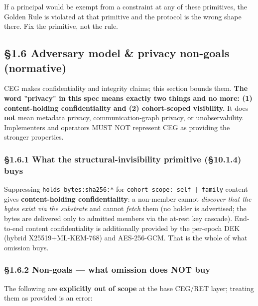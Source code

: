 \documentclass[10pt]{article}
\begin{document}
If a principal would be exempt from a constraint at any of these primitives, the Golden Rule is violated at that primitive and the protocol is the wrong shape there. Fix the primitive, not the rule.


\subsection*{§1.6 Adversary model \& privacy non-goals (normative)}


CEG makes confidentiality and integrity claims; this section bounds them. \textbf{The word "privacy" in this spec means exactly two things and no more: (1) content-holding confidentiality and (2) cohort-scoped visibility.} It does \textbf{not} mean metadata privacy, communication-graph privacy, or unobservability. Implementers and operators MUST NOT represent CEG as providing the stronger properties.


\subsubsection*{§1.6.1 What the structural-invisibility primitive (§10.1.4) buys}

Suppressing \texttt{holds\_bytes:sha256:*} for \texttt{cohort\_scope: self | family} content gives \textbf{content-holding confidentiality}: a non-member cannot \textit{discover that the bytes exist via the substrate} and cannot \textit{fetch} them (no holder is advertised; the bytes are delivered only to admitted members via the at-rest key cascade). End-to-end content confidentiality is additionally provided by the per-epoch DEK (hybrid X25519+ML-KEM-768) and AES-256-GCM. That is the whole of what omission buys.


\subsubsection*{§1.6.2 Non-goals — what omission does NOT buy}

The following are \textbf{explicitly out of scope} at the base CEG/RET layer; treating them as provided is an error:
\end{document}
